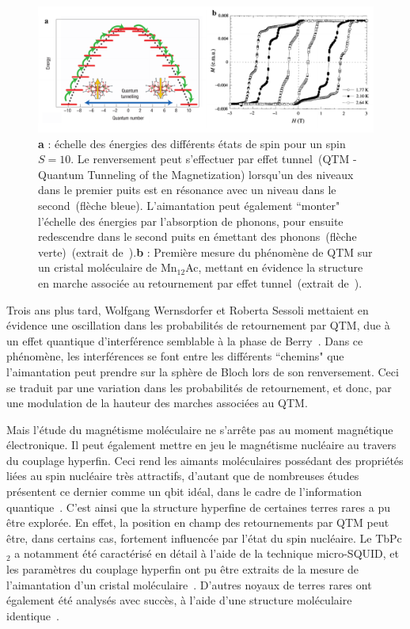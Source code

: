 \begin{figure}
\centering \includegraphics[scale=0.45]{Spintronique/MolecularMag/MolecularMag.pdf}
\caption{ \textbf{a} : échelle des énergies des différents états de spin pour un spin $S=10$. Le renversement peut s'effectuer par effet tunnel~(QTM - Quantum Tunneling of the Magnetization) lorsqu'un des niveaux dans le premier puits est en résonance avec un niveau dans le second~(flèche bleue). L'aimantation peut également ``monter" l'échelle des énergies par l’absorption de phonons, pour ensuite redescendre dans le second puits en émettant des phonons~(flèche verte)~(extrait de~\cite{Bogani2008}).\textbf{b} : Première mesure du phénomène de QTM sur un cristal moléculaire de Mn$_{12}$Ac, mettant en évidence la structure en marche associée au retournement par effet tunnel~(extrait de~\cite{Thomas1996}).}
\label{MolecularMag}
\end{figure}

Trois ans plus tard, Wolfgang Wernsdorfer et Roberta Sessoli mettaient en évidence une oscillation dans les probabilités de retournement par QTM, due à un effet quantique d'interférence semblable à la phase de Berry~\cite{Wernsdorfer1999}. Dans ce phénomène, les interférences se font entre les différents ``chemins" que l’aimantation peut prendre sur la sphère de Bloch lors de son renversement. Ceci se traduit par une variation dans les probabilités de retournement, et donc, par une modulation de la hauteur des marches associées au QTM.

Mais l'étude du magnétisme moléculaire ne s'arr\^ete pas au moment magnétique électronique. Il peut également mettre en jeu le magnétisme nucléaire au travers du couplage hyperfin. Ceci rend les aimants moléculaires possédant des propriétés liées au spin nucléaire très attractifs, d'autant que de nombreuses études présentent ce dernier comme un qbit idéal, dans le cadre de l'information quantique~\cite{Kane1998,Vandersypen2001,Leuenberger2003}. C'est ainsi que la structure hyperfine de certaines terres rares a pu être explorée. En effet, la position en champ des retournements par QTM peut être, dans certains cas, fortement influencée par l'état du spin nucléaire. Le TbPc$_{2}$ a notamment été caractérisé en détail à l'aide de la technique micro-SQUID, et les paramètres du couplage hyperfin ont pu être extraits de la mesure de l'aimantation d'un cristal moléculaire~\cite{Ishikawa2005}. D'autres noyaux de terres rares ont également été analysés avec succès, à l'aide d'une structure moléculaire identique~\cite{Ishikawa2005a}.

